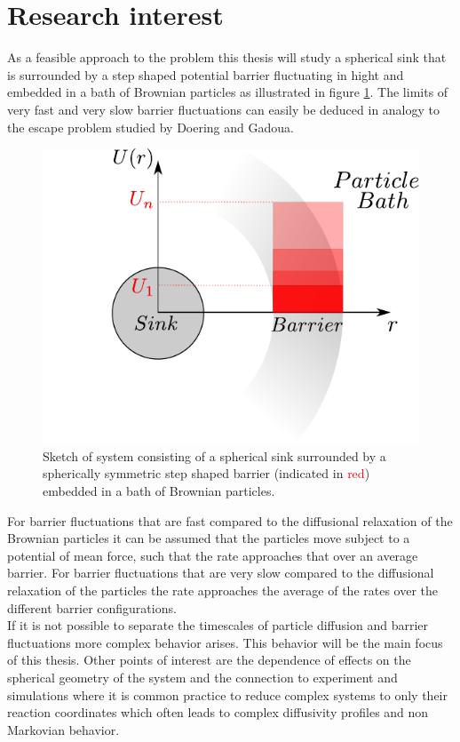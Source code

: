 \section{Research interest}
As a feasible approach to the problem this thesis will study a spherical sink that is surrounded by a step shaped potential barrier fluctuating in hight and embedded in a bath of Brownian particles as illustrated in figure \ref{introSketch}. The limits of very fast and very slow barrier fluctuations can easily be deduced in analogy to the escape problem studied by Doering and Gadoua. \par
\begin{figure}
    \hspace{-2 cm}\includegraphics[width = 1.1 \textwidth]{plots/IntroSkizze.pdf}
    \caption{Sketch of system consisting of a spherical sink surrounded by a spherically symmetric step shaped barrier (indicated in \textcolor{red}{red}) embedded in a bath of Brownian particles.}
    \label{introSketch}
\end{figure}
For barrier fluctuations that are fast compared to the diffusional relaxation of the Brownian particles it can be assumed that the particles move subject to a potential of mean force, such that the rate approaches that over an average barrier. For barrier fluctuations that are very slow compared to the diffusional relaxation of the particles the rate approaches the average of the rates over the different barrier configurations. \\

If it is not possible to separate the timescales of particle diffusion and barrier fluctuations more complex behavior arises. This behavior will be the main focus of this thesis. 
Other points of interest are the dependence of effects on the spherical geometry of the system and the connection to experiment and simulations where it is common practice to reduce complex systems to only their reaction coordinates which often leads to complex diffusivity profiles and non Markovian behavior.

